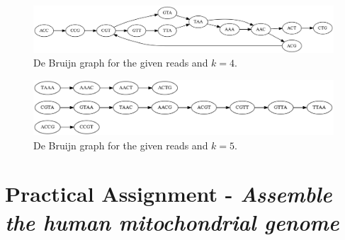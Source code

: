\documentclass[%
   10pt,              %
   ngerman,           %
   a4paper,           %
   DIV11,             %
]{scrartcl}%
\begin{document}
\begin{figure}[h]
 \centering
 \includegraphics[width=1\textwidth]{deBruijnGraph_4mere.png}
 \caption{De Bruijn graph for the given reads and $k = 4$.}
 \label{fig:4mere}
\end{figure}

\begin{figure}[h]
 \centering
 \includegraphics[width=1\textwidth]{deBruijnGraph_5mere.png}
 \caption{De Bruijn graph for the given reads and $k = 5$.}
 \label{fig:5mere}
\end{figure}



\section*{Practical Assignment - \textit{Assemble the human mitochondrial genome}}
\end{document}
